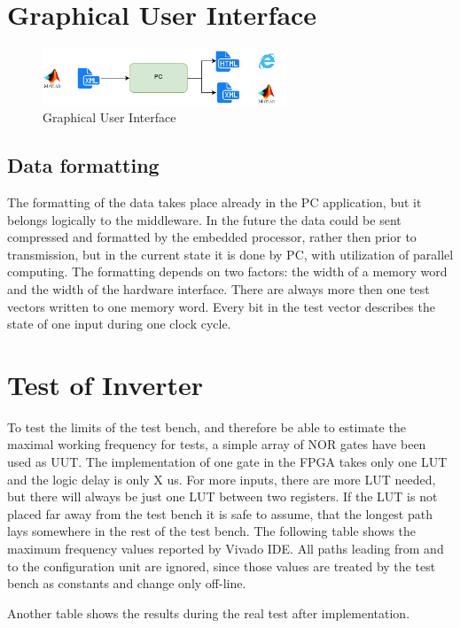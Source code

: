 \section{Graphical User Interface}

\begin{figure}[h]
\centering
\includegraphics[width=0.65\textwidth]{figures/PC.png}
\caption{Graphical User Interface}
\label{fig:gui}
\end{figure}

\subsection{Data formatting}
The formatting of the data takes place already in the PC application, but it belongs logically to the middleware. In the future the data could be sent compressed and formatted by the embedded processor, rather then prior to transmission, but in the current state it is done by PC, with utilization of parallel computing. The formatting depends on two factors: the width of a memory word and the width of the hardware interface. There are always more then one test vectors written to one memory word. Every bit in the test vector describes the state of one input during one clock cycle.

\section{Test of Inverter}
To test the limits of the test bench, and therefore be able to estimate the maximal working frequency for tests, a simple array of NOR gates have been used as UUT. The implementation of one gate in the FPGA takes only one LUT and the logic delay is only X us. For more inputs, there are more LUT needed, but there will always be just one LUT between two registers. If the LUT is not placed far away from the test bench it is safe to assume, that the longest path lays somewhere in the rest of the test bench. The following table shows the maximum frequency values reported by Vivado IDE. All paths leading from and to the configuration unit are ignored, since those values are treated by the test bench as constants and change only off-line.

Another table shows the results during the real test after implementation.

